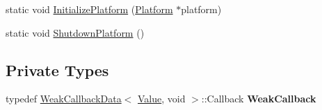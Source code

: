 \begin{DoxyCompactItemize}
\item 
static void \hyperlink{classv8_1_1_v8_a79a2ecd6b949acdbddd9154630ad84ec}{Initialize\+Platform} (\hyperlink{classv8_1_1_platform}{Platform} $\ast$platform)
\item 
static void \hyperlink{classv8_1_1_v8_af302210d82c9c2b98f7fb16ecf88482a}{Shutdown\+Platform} ()
\end{DoxyCompactItemize}
\subsection*{Private Types}
\begin{DoxyCompactItemize}
\item 
typedef \hyperlink{classv8_1_1_weak_callback_data}{Weak\+Callback\+Data}$<$ \hyperlink{classv8_1_1_value}{Value}, void $>$\+::Callback {\bfseries Weak\+Callback}\hypertarget{classv8_1_1_v8_a050831c46e8ab0e9253f70169006919e}{}\label{classv8_1_1_v8_a050831c46e8ab0e9253f70169006919e}

\end{DoxyCompactItemize}
